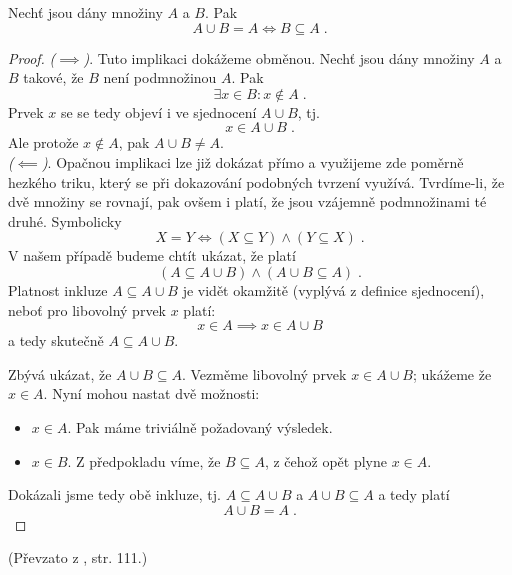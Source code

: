 \begin{assertion}
    Nechť jsou dány množiny $A$ a $B$. Pak
    \begin{equation*}
        A \cup B=A \iff B \subseteq A\; .
    \end{equation*}
\end{assertion}
\begin{proof}
    \textit{($\implies$)}. Tuto implikaci dokážeme obměnou. Nechť jsou dány množiny $A$ a $B$ takové, že $B$ není podmnožinou $A$. Pak
    \begin{equation*}
        \exists x\in B : x\notin A\; .
    \end{equation*}
    Prvek $x$ se se tedy objeví i ve sjednocení $A \cup B$, tj.
    \begin{equation*}
        x\in A \cup B\; .
    \end{equation*}
    Ale protože $x\notin A$, pak $A \cup B \neq A$.\\
    \textit{($\impliedby$)}. Opačnou implikaci lze již dokázat přímo a využijeme zde poměrně hezkého triku, který se při dokazování podobných tvrzení využívá. Tvrdíme-li, že dvě množiny se rovnají, pak ovšem i platí, že jsou vzájemně podmnožinami té druhé. Symbolicky
    \begin{equation*}
        X = Y \iff (X \subseteq Y) \land (Y \subseteq X)\; .
    \end{equation*}
    V našem případě budeme chtít ukázat, že platí
    \begin{equation*}
        (A \subseteq A \cup B) \land (A \cup B \subseteq A)\; .
    \end{equation*}
    Platnost inkluze $A \subseteq A \cup B$ je vidět okamžitě (vyplývá z definice sjednocení), neboť pro libovolný prvek $x$ platí:
    \begin{equation*}
        x \in A \implies x \in A \cup B
    \end{equation*}
    a tedy skutečně $A \subseteq A \cup B$.\par
    Zbývá ukázat, že $A \cup B \subseteq A$. Vezměme libovolný prvek $x \in A \cup B$; ukážeme že $x\in A$. Nyní mohou nastat dvě možnosti:
    \begin{itemize}
        \item $x \in A$. Pak máme triviálně požadovaný výsledek.
        \item $x \in B$. Z předpokladu víme, že $B \subseteq A$, z čehož opět plyne $x\in A$.
    \end{itemize}
    Dokázali jsme tedy obě inkluze, tj. $A \subseteq A \cup B$ a $A \cup B \subseteq A$ a tedy platí
    \begin{equation*}
        A \cup B = A\; .
    \end{equation*}
\end{proof}
(Převzato z \cite{ChartrandPolimeniZhang2014}, str. 111.)
